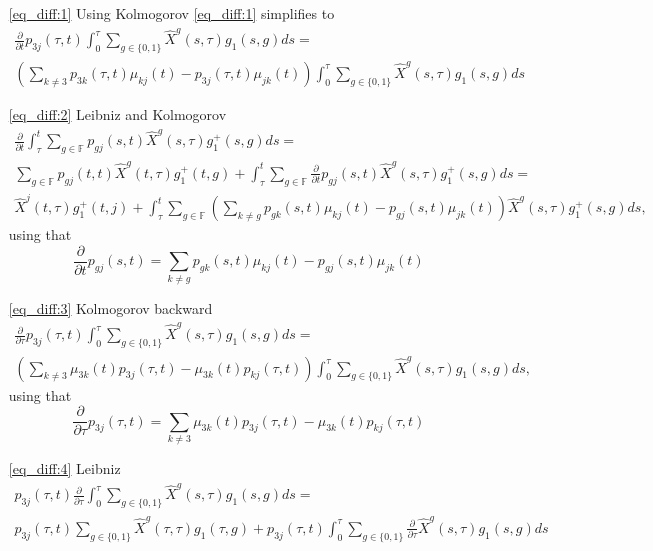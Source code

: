 \documentclass[12pt]{article}
\begin{document}
\begin{itemize}
\item[\eqref{eq_diff:1}] Using Kolmogorov \eqref{eq_diff:1} simplifies to
\begin{gather*}
\frac{\partial}{\partial t}p_{3j}(\tau,t) \int_0^{\tau} \sum_{g \in \{0 , 1\}} \hat{X}^g(s,\tau) g_1(s,g) ds = \\
\left( \sum_{k\neq 3} p_{3k}(\tau,t)\mu_{kj}(t)- p_{3j}(\tau,t)\mu_{jk}(t) \right)
\int_0^{\tau} \sum_{g \in \{0 , 1\}} \hat{X}^g(s,\tau) g_1(s,g) ds
\end{gather*}
\item[\eqref{eq_diff:2}] Leibniz and Kolmogorov
\begin{gather*}
\frac{\partial}{\partial t} \int_{\tau}^t \sum_{g \in \mathbb{F}} 
p_{gj}(s,t) \hat{X}^g(s,\tau) g_1^+(s,g)  ds
=
\\
\sum_{g \in \mathbb{F}} 
p_{gj}(t,t) \hat{X}^g(t,\tau) g_1^+(t,g) 
+
\int_{\tau}^t \sum_{g \in \mathbb{F}} 
\frac{\partial}{\partial t}  p_{gj}(s,t) \hat{X}^g(s,\tau) g_1^+(s,g) ds
=
\\
\hat{X}^j(t,\tau) g_1^+(t,j)  
+
\int_{\tau}^t \sum_{g \in \mathbb{F}} 
\left(\sum_{k\neq g} p_{gk}(s,t)\mu_{kj}(t)- p_{gj}(s,t)\mu_{jk}(t)\right) \hat{X}^g(s,\tau) g_1^+(s,g) ds,
\end{gather*}
using that
$$
\frac{\partial}{\partial t}  p_{gj}(s,t)= \sum_{k\neq g} p_{gk}(s,t)\mu_{kj}(t)- p_{gj}(s,t)\mu_{jk}(t)
$$
\item[\eqref{eq_diff:3}] Kolmogorov backward
\begin{gather*}
\frac{\partial}{\partial \tau}  p_{3j}(\tau,t) 
\int_0^{\tau}  \sum_{g \in \{0 , 1\}} \hat{X}^g(s,\tau) g_1(s,g) ds = \\
\left( \sum_{k\neq 3} \mu_{3k}(t)p_{3j}(\tau,t) - \mu_{3k}(t) p_{kj}(\tau,t) \right)
\int_0^{\tau}  \sum_{g \in \{0 , 1\}}   \hat{X}^g(s,\tau) g_1(s,g) ds ,
\end{gather*}
using that
$$
\frac{\partial}{\partial \tau}  p_{3j}(\tau,t) =\sum_{k\neq 3} \mu_{3k}(t)p_{3j}(\tau,t) - \mu_{3k}(t) p_{kj}(\tau,t)
$$
\item[\eqref{eq_diff:4}] Leibniz
\begin{gather*}
p_{3j}(\tau,t) \frac{\partial}{\partial \tau}\int_0^{\tau}  \sum_{g \in \{0 , 1\}} \hat{X}^g(s,\tau) g_1(s,g) ds = \\
p_{3j}(\tau,t)  \sum_{g \in \{0 , 1\}}   \hat{X}^g(\tau,\tau) g_1(\tau,g) 
+
p_{3j}(\tau,t)  \int_0^{\tau}  \sum_{g \in \{0 , 1\}}  \frac{\partial}{\partial \tau} \hat{X}^g(s,\tau) g_1(s,g) ds
\end{gather*}

\end{itemize}
\end{document}
